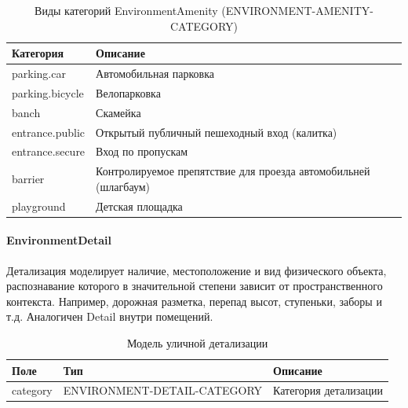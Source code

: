        \begin{center}
          \begin{xltabular}{\linewidth}{|l|X|}
            \caption{Виды категорий EnvironmentAmenity (ENVIRONMENT-AMENITY-CATEGORY)}\\           \hline
            Категория       & Описание                                                        \\\hline
            parking.car     & Автомобильная парковка                                          \\\hline
            parking.bicycle & Велопарковка                                                    \\\hline
            banch           & Скамейка                                                        \\\hline
            entrance.public & Открытый публичный пешеходный вход (калитка)                    \\\hline
            entrance.secure & Вход по пропускам                                               \\\hline
            barrier         & Контролируемое препятствие для проезда автомобильней (шлагбаум) \\\hline
            playground      & Детская площадка                                                \\\hline
          \end{xltabular}
        \end{center}

      \paragraph{EnvironmentDetail}
        Детализация моделирует наличие, местоположение и вид физического объекта, распознавание которого в значительной степени зависит от пространственного контекста. Например, дорожная разметка, перепад высот, ступеньки, заборы и т.д. Аналогичен Detail внутри помещений.
        \begin{center}
          \begin{xltabular}{\linewidth}{|l|p{4cm}|X|}
            \caption{Модель уличной детализации}\\\hline
            Поле     & Тип                         & Описание              \\ \hline
            category & ENVIRONMENT-DETAIL-CATEGORY & Категория детализации \\ \hline
          \end{xltabular}
        \end{center}

